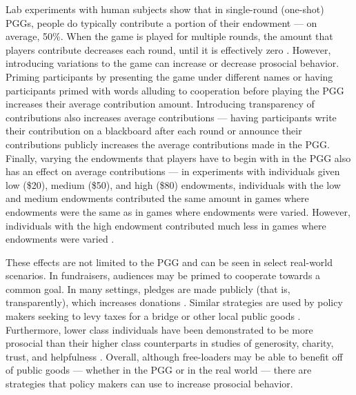 Lab experiments with human subjects show that in single-round (one-shot) PGGs, people do typically contribute a portion of their endowment — on average, 50\%. When the game is played for multiple rounds, the amount that players contribute decreases each round, until it is effectively zero \cite{labexperiments}. However, introducing variations to the game can increase or decrease prosocial behavior. Priming participants by presenting the game under different names \cite{Eriksson_Strimling_2014} or having participants primed with words alluding to cooperation before playing the PGG \cite{drouvelis2015priming} increases their average contribution amount. Introducing transparency of contributions also increases average contributions — having participants write their contribution on a blackboard after each round \cite{rege2004impact} or announce their contributions publicly \cite{transparencytwo} increases the average contributions made in the PGG. Finally, varying the endowments that players have to begin with in the PGG also has an effect on average contributions — in experiments with individuals given low (\$20), medium (\$50), and high (\$80) endowments, individuals with the low and medium endowments contributed the same amount in games where endowments were the same as in games where endowments were varied. However, individuals with the high endowment contributed much less in games where endowments were varied \cite{HARGREAVESHEAP20164}.

These effects are not limited to the PGG and can be seen in select real-world scenarios. In fundraisers, audiences may be primed to cooperate towards a common goal. In many settings, pledges are made publicly (that is, transparently), which increases donations \cite{Bhati2020-xw, Oppenheimer2011-zh}. Similar strategies are used by policy makers seeking to levy taxes for a bridge or other local public goods \cite{parks2013cooperation}. Furthermore, lower class individuals have been demonstrated to be more prosocial than their higher class counterparts in studies of generosity, charity, trust, and helpfulness \cite{piff2010having}. Overall, although free-loaders may be able to benefit off of public goods — whether in the PGG or in the real world — there are strategies that policy makers can use to increase prosocial behavior.



